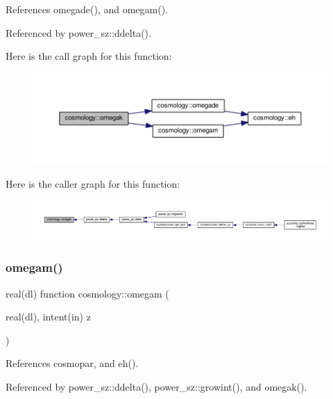 References omegade(), and omegam().



Referenced by power\+\_\+sz\+::ddelta().

Here is the call graph for this function\+:
\nopagebreak
\begin{figure}[H]
\begin{center}
\leavevmode
\includegraphics[width=350pt]{namespacecosmology_ac8a5367c45bf7773b9a8e27fb7ff59ec_cgraph}
\end{center}
\end{figure}
Here is the caller graph for this function\+:
\nopagebreak
\begin{figure}[H]
\begin{center}
\leavevmode
\includegraphics[width=350pt]{namespacecosmology_ac8a5367c45bf7773b9a8e27fb7ff59ec_icgraph}
\end{center}
\end{figure}
\mbox{\label{namespacecosmology_aeef992799f00205f3a31ac86d34da7e2}} 
\subsubsection{\texorpdfstring{omegam()}{omegam()}}
{\footnotesize\ttfamily real(dl) function cosmology\+::omegam (\begin{DoxyParamCaption}\item[{real(dl), intent(in)}]{z }\end{DoxyParamCaption})}



References cosmopar, and eh().



Referenced by power\+\_\+sz\+::ddelta(), power\+\_\+sz\+::growint(), and omegak().

